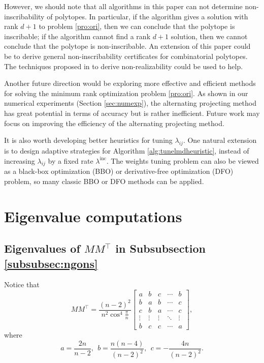 \documentclass[smallextended, envcountsame]{svjour3}
\begin{document}
    However, we should note that all algorithms in this paper can not determine non-inscribability of polytopes.  In particular, if the algorithm gives a solution with rank $d+1$ to problem \eqref{pro:ori}, then we can conclude that the polytope is inscribable; if the algorithm cannot find a rank $d+1$ solution, then we cannot conclude that the polytope is non-inscribable.  An extension of this paper could be to derive general non-inscribability certificates for combinatorial polytopes.  The techniques proposed in \cite{gouveia2023general} to derive non-realizability could be used to help.

    Another future direction would be exploring more effective and efficient methods for solving the minimum rank optimization problem \eqref{pro:ori}.  As shown in our numerical experiments (Section \ref{sec:numexp}), the alternating projecting method has great potential in terms of accuracy but is rather inefficient.  Future work may focus on improving the efficiency of the alternating projecting method.

    It is also worth developing better heuristics for tuning $\lambda_{ij}$.  One natural extension is to design adaptive strategies for Algorithm \ref{alg:tunelmdheuristic}, instead of increasing $\lambda_{ij}$ by a fixed rate $\lambda^{\mathrm{inc}}$.  The weights tuning problem can also be viewed as a black-box optimization (BBO) or derivative-free optimization (DFO) problem, so many classic BBO or DFO methods can be applied.





\appendix

\section{Eigenvalue computations}
\subsection{Eigenvalues of $MM^\top$ in Subsubsection \ref{subsubsec:ngons}}\label{app:ngons_eigv}
Notice that 
\begin{equation*}
    MM^\top = \frac{(n-2)^2}{n^2\cos^4\frac{\pi}{n}} \begin{bmatrix}
        a & b & c & \cdots & b\\
        b & a & b & \cdots & c\\    
        c & b & a & \cdots & c\\
        \vdots & \vdots & \vdots & \ddots & \vdots\\
        b & c & c & \cdots & a
\end{bmatrix},
\end{equation*}
where
\begin{equation*}
    a=\frac{2n}{n-2},~~b=\frac{n(n-4)}{(n-2)^2},~~c=-\frac{4n}{(n-2)^2}.
\end{equation*}
\end{document}

